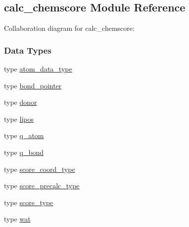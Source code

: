 \hypertarget{classcalc__chemscore}{\subsection{calc\-\_\-chemscore Module Reference}
\label{classcalc__chemscore}
}


Collaboration diagram for calc\-\_\-chemscore\-:
\subsubsection*{Data Types}
\begin{DoxyCompactItemize}
\item 
type \hyperlink{structcalc__chemscore_1_1atom__data__type}{atom\-\_\-data\-\_\-type}
\item 
type \hyperlink{structcalc__chemscore_1_1bond__pointer}{bond\-\_\-pointer}
\item 
type \hyperlink{structcalc__chemscore_1_1donor}{donor}
\item 
type \hyperlink{structcalc__chemscore_1_1lipos}{lipos}
\item 
type \hyperlink{structcalc__chemscore_1_1q__atom}{q\-\_\-atom}
\item 
type \hyperlink{structcalc__chemscore_1_1q__bond}{q\-\_\-bond}
\item 
type \hyperlink{structcalc__chemscore_1_1score__coord__type}{score\-\_\-coord\-\_\-type}
\item 
type \hyperlink{structcalc__chemscore_1_1score__precalc__type}{score\-\_\-precalc\-\_\-type}
\item 
type \hyperlink{structcalc__chemscore_1_1score__type}{score\-\_\-type}
\item 
type \hyperlink{structcalc__chemscore_1_1wat}{wat}
\end{DoxyCompactItemize}
